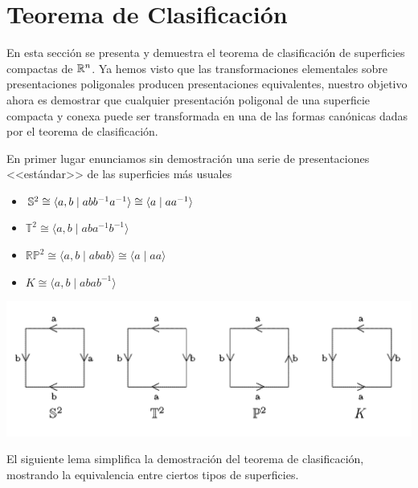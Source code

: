 \clearpage

\section{Teorema de Clasificación}

En esta sección se presenta y demuestra el teorema de clasificación de superficies compactas de $\mathbb{R} ^n$. Ya hemos visto que las transformaciones elementales sobre presentaciones poligonales producen presentaciones equivalentes, nuestro objetivo ahora es demostrar que cualquier presentación poligonal de una superficie compacta y conexa puede ser transformada en una de las formas canónicas dadas por el teorema de clasificación.

En primer lugar enunciamos sin demostración una serie de presentaciones <<estándar>> de las superficies más usuales
\begin{itemize}
    \item $\mathbb{S}^2 \cong \langle a,b \mid abb^{-1}a^{-1} \rangle \cong \langle a \mid aa^{-1} \rangle$
    \item $\mathbb{T}^2 \cong \langle a,b \mid aba^{-1}b^{-1} \rangle$
    \item $\mathbb{RP}^2 \cong \langle a,b \mid abab \rangle \cong \langle a \mid aa \rangle$
    \item $K \cong \langle a,b \mid abab^{-1} \rangle$
\end{itemize}

\begin{center}
    \includegraphics[width=\textwidth]{img/realizacion-geom.png}
\end{center}

El siguiente lema simplifica la demostración del teorema de clasificación, mostrando la equivalencia entre ciertos tipos de superficies.

